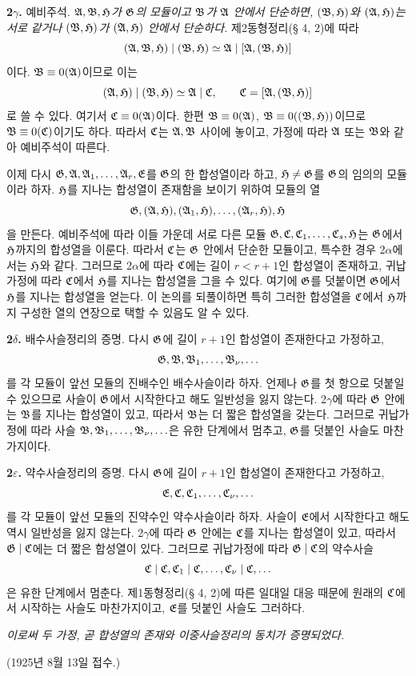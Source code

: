 \textbf{2\(\gamma\).} 예비주석. \emph{\(\mathfrak A,\mathfrak B,\mathfrak H\)가 \(\mathfrak G\)의 모듈이고 \(\mathfrak B\)가 \(\mathfrak A\) 안에서 단순하면, \((\mathfrak B,\mathfrak H)\)와 \((\mathfrak A,\mathfrak H)\)는 서로 같거나 \((\mathfrak B,\mathfrak H)\)가 \((\mathfrak A,\mathfrak H)\) 안에서 단순하다.} 제2동형정리(§ 4, 2)에 따라
\[
        (\mathfrak A,\mathfrak B,\mathfrak H)\mid(\mathfrak B,\mathfrak H)
        \simeq \mathfrak A\mid[\mathfrak A,(\mathfrak B,\mathfrak H)]
\]
이다. \(\mathfrak B\equiv0(\mathfrak A)\)이므로 이는
\[
        (\mathfrak A,\mathfrak H)\mid(\mathfrak B,\mathfrak H)\simeq\mathfrak A\mid\mathfrak{C},
        \qquad
        \mathfrak{C}=[\mathfrak A,(\mathfrak B,\mathfrak H)]
\]
로 쓸 수 있다. 여기서 \(\mathfrak{C}\equiv0(\mathfrak A)\)이다. 한편 \(\mathfrak B\equiv0(\mathfrak A)\), \(\mathfrak B\equiv0((\mathfrak B,\mathfrak H))\)이므로 \(\mathfrak B\equiv0(\mathfrak{C})\)이기도 하다. 따라서 \(\mathfrak{C}\)는 \(\mathfrak A,\mathfrak B\) 사이에 놓이고, 가정에 따라 \(\mathfrak A\) 또는 \(\mathfrak B\)와 같아 예비주석이 따른다.

이제 다시 \(\mathfrak G,\mathfrak A,\mathfrak A_1,\ldots,\mathfrak A_r,\mathfrak E\)를 \(\mathfrak G\)의 한 합성열이라 하고, \(\mathfrak H\ne\mathfrak G\)를 \(\mathfrak G\)의 임의의 모듈이라 하자. \(\mathfrak H\)를 지나는 합성열이 존재함을 보이기 위하여 모듈의 열
\[
        \mathfrak G,(\mathfrak A,\mathfrak H),(\mathfrak A_1,\mathfrak H),\ldots,(\mathfrak A_r,\mathfrak H),\mathfrak H
\]
을 만든다. 예비주석에 따라 이들 가운데 서로 다른 모듈 \(\mathfrak G,\mathfrak{C},\mathfrak{C}_1,\ldots,\mathfrak{C}_s,\mathfrak H\)는 \(\mathfrak G\)에서 \(\mathfrak H\)까지의 합성열을 이룬다. 따라서 \(\mathfrak{C}\)는 \(\mathfrak G\) 안에서 단순한 모듈이고, 특수한 경우 2\(\alpha\)에서는 \(\mathfrak H\)와 같다. 그러므로 2\(\alpha\)에 따라 \(\mathfrak{C}\)에는 길이 \(r<r+1\)인 합성열이 존재하고, 귀납가정에 따라 \(\mathfrak{C}\)에서 \(\mathfrak H\)를 지나는 합성열을 그을 수 있다. 여기에 \(\mathfrak G\)를 덧붙이면 \(\mathfrak G\)에서 \(\mathfrak H\)를 지나는 합성열을 얻는다. 이 논의를 되풀이하면 특히 그러한 합성열을 \(\mathfrak{C}\)에서 \(\mathfrak H\)까지 구성한 열의 연장으로 택할 수 있음도 알 수 있다.

\textbf{2\(\delta\).} 배수사슬정리의 증명. 다시 \(\mathfrak G\)에 길이 \(r+1\)인 합성열이 존재한다고 가정하고,
\[
        \mathfrak G,\mathfrak B,\mathfrak B_1,\ldots,\mathfrak B_\nu,\ldots
\]
를 각 모듈이 앞선 모듈의 진배수인 배수사슬이라 하자. 언제나 \(\mathfrak G\)를 첫 항으로 덧붙일 수 있으므로 사슬이 \(\mathfrak G\)에서 시작한다고 해도 일반성을 잃지 않는다. 2\(\gamma\)에 따라 \(\mathfrak G\) 안에는 \(\mathfrak B\)를 지나는 합성열이 있고, 따라서 \(\mathfrak B\)는 더 짧은 합성열을 갖는다. 그러므로 귀납가정에 따라 사슬 \(\mathfrak B,\mathfrak B_1,\ldots,\mathfrak B_\nu,\ldots\)은 유한 단계에서 멈추고, \(\mathfrak G\)를 덧붙인 사슬도 마찬가지이다.

\textbf{2\(\varepsilon\).} 약수사슬정리의 증명. 다시 \(\mathfrak G\)에 길이 \(r+1\)인 합성열이 존재한다고 가정하고,
\[
        \mathfrak E,\mathfrak{C},\mathfrak{C}_1,\ldots,\mathfrak{C}_\nu,\ldots
\]
를 각 모듈이 앞선 모듈의 진약수인 약수사슬이라 하자. 사슬이 \(\mathfrak E\)에서 시작한다고 해도 역시 일반성을 잃지 않는다. 2\(\gamma\)에 따라 \(\mathfrak G\) 안에는 \(\mathfrak{C}\)를 지나는 합성열이 있고, 따라서 \(\mathfrak G\mid\mathfrak{C}\)에는 더 짧은 합성열이 있다. 그러므로 귀납가정에 따라 \(\mathfrak G\mid\mathfrak{C}\)의 약수사슬
\[
        \mathfrak{C}\mid\mathfrak{C},\mathfrak{C}_1\mid\mathfrak{C},\ldots,\mathfrak{C}_\nu\mid\mathfrak{C},\ldots
\]
은 유한 단계에서 멈춘다. 제1동형정리(§ 4, 2)에 따른 일대일 대응 때문에 원래의 \(\mathfrak{C}\)에서 시작하는 사슬도 마찬가지이고, \(\mathfrak E\)를 덧붙인 사슬도 그러하다.

\emph{이로써 두 가정, 곧 합성열의 존재와 이중사슬정리의 동치가 증명되었다.}

\begin{center}
(1925년 8월 13일 접수.)
\end{center}

\clearpage
\setcounter{footnote}{0}
